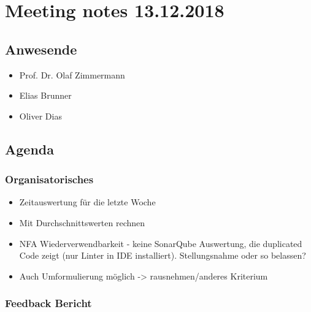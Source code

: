 \hypertarget{meeting-notes-13122018}{%
\section*{Meeting notes 13.12.2018}\label{meeting-notes-13122018}}

\hypertarget{anwesende}{%
\subsection*{Anwesende}\label{anwesende}}

\begin{itemize}

\item
  Prof. Dr. Olaf Zimmermann
\item
  Elias Brunner
\item
  Oliver Dias
\end{itemize}

\hypertarget{agenda}{%
\subsection*{Agenda}\label{agenda}}

\hypertarget{organisatorisches}{%
\subsubsection*{Organisatorisches}\label{organisatorisches}}

\begin{itemize}
\item
  Zeitauswertung für die letzte Woche
\item
  Mit Durchschnittswerten rechnen
\item
  NFA Wiederverwendbarkeit - keine SonarQube Auswertung, die duplicated
  Code zeigt (nur Linter in IDE installiert). Stellungsnahme oder so
  belassen?
\item
  Auch Umformulierung möglich -\textgreater{} rausnehmen/anderes
  Kriterium
\end{itemize}

\hypertarget{feedback-bericht}{%
\subsubsection*{Feedback Bericht}\label{feedback-bericht}}

